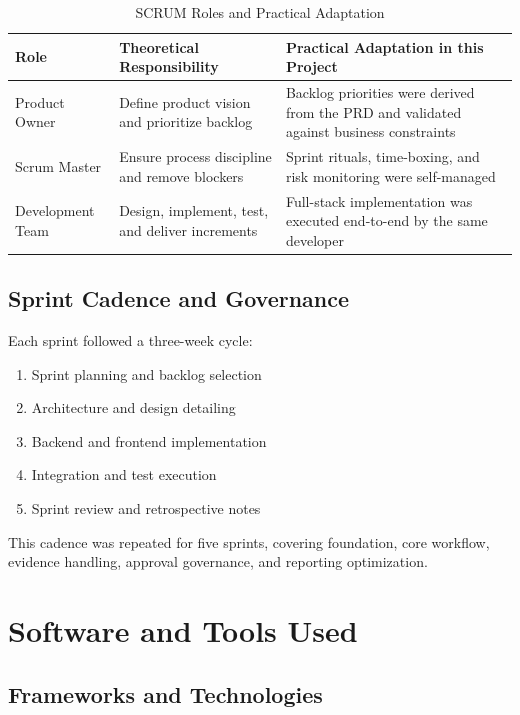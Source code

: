 \begin{table}[H]
\centering
\caption{SCRUM Roles and Practical Adaptation}
\label{tab:scrum_roles_adaptation}
\begin{tabularx}{\textwidth}{|l|X|X|}
\hline
\textbf{Role} & \textbf{Theoretical Responsibility} & \textbf{Practical Adaptation in this Project} \\
\hline
Product Owner & Define product vision and prioritize backlog & Backlog priorities were derived from the PRD and validated against business constraints \\
\hline
Scrum Master & Ensure process discipline and remove blockers & Sprint rituals, time-boxing, and risk monitoring were self-managed \\
\hline
Development Team & Design, implement, test, and deliver increments & Full-stack implementation was executed end-to-end by the same developer \\
\hline
\end{tabularx}
\end{table}

\subsection{Sprint Cadence and Governance}

Each sprint followed a three-week cycle:

\begin{enumerate}
\item Sprint planning and backlog selection
\item Architecture and design detailing
\item Backend and frontend implementation
\item Integration and test execution
\item Sprint review and retrospective notes
\end{enumerate}

This cadence was repeated for five sprints, covering foundation, core workflow, evidence handling, approval governance, and reporting optimization.

\section{Software and Tools Used}

\subsection{Frameworks and Technologies}

